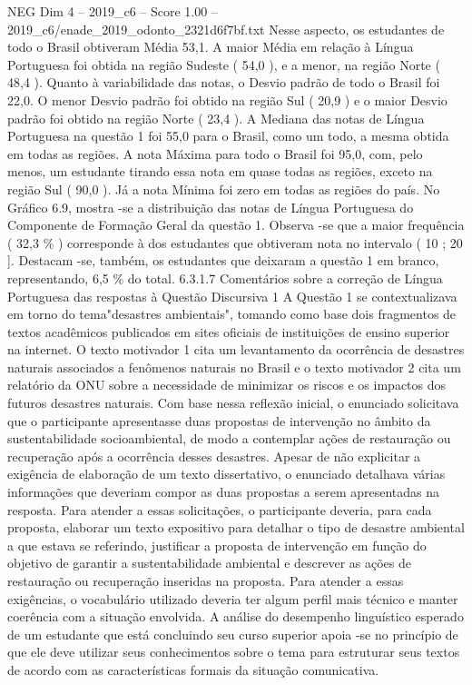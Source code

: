\begin{textsample}{NEG Dim 4 – 2019\_c6 – Score 1.00 – 2019\_c6/enade\_2019\_odonto\_2321d6f7bf.txt}
Nesse aspecto, os estudantes de todo o Brasil obtiveram Média 53,1.
A maior Média em relação à Língua Portuguesa foi obtida na região Sudeste ( 54,0 ), e a menor, na região Norte ( 48,4 ).
Quanto à variabilidade das notas, o Desvio padrão de todo o Brasil foi 22,0.
O menor Desvio padrão foi obtido na região Sul ( 20,9 ) e o maior Desvio padrão foi obtido na região Norte ( 23,4 ).
A Mediana das notas de Língua Portuguesa na questão 1 foi 55,0 para o Brasil, como um todo, a mesma obtida em todas as regiões.
A nota Máxima para todo o Brasil foi 95,0, com, pelo menos, um estudante tirando essa nota em quase todas as regiões, exceto na região Sul ( 90,0 ).
Já a nota Mínima foi zero em todas as regiões do país.
No Gráfico 6.9, mostra -se a distribuição das notas de Língua Portuguesa do Componente de Formação Geral da questão 1.
Observa -se que a maior frequência ( 32,3 \% ) corresponde à dos estudantes que obtiveram nota no intervalo ( 10 ; 20 ].
Destacam -se, também, os estudantes que deixaram a questão 1 em branco, representando, 6,5 \% do total. 6.3.1.7 Comentários sobre a correção de Língua Portuguesa das respostas à Questão Discursiva 1 A Questão 1 se contextualizava em torno do tema"desastres ambientais", tomando como base dois fragmentos de textos acadêmicos publicados em sites oficiais de instituições de ensino superior na internet.
O texto motivador 1 cita um levantamento da ocorrência de desastres naturais associados a fenômenos naturais no Brasil e o texto motivador 2 cita um relatório da ONU sobre a necessidade de minimizar os riscos e os impactos dos futuros desastres naturais.
Com base nessa reflexão inicial, o enunciado solicitava que o participante apresentasse duas propostas de intervenção no âmbito da sustentabilidade socioambiental, de modo a contemplar ações de restauração ou recuperação após a ocorrência desses desastres.
Apesar de não explicitar a exigência de elaboração de um texto dissertativo, o enunciado detalhava várias informações que deveriam compor as duas propostas a serem apresentadas na resposta.
Para atender a essas solicitações, o participante deveria, para cada proposta, elaborar um texto expositivo para detalhar o tipo de desastre ambiental a que estava se referindo, justificar a proposta de intervenção em função do objetivo de garantir a sustentabilidade ambiental e descrever as ações de restauração ou recuperação inseridas na proposta.
Para atender a essas exigências, o vocabulário utilizado deveria ter algum perfil mais técnico e manter coerência com a situação envolvida.
A análise do desempenho linguístico esperado de um estudante que está concluindo seu curso superior apoia -se no princípio de que ele deve utilizar seus conhecimentos sobre o tema para estruturar seus textos de acordo com as características formais da situação comunicativa.

\end{textsample}
